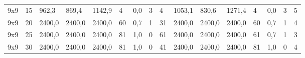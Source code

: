\begin{table}[]
\begin{tabular}{llllllllllllllll}
		9x9     & 15     & 962,3                                               & 869,4                                               & 1142,9                                              & 4                                                   & 0,0                                                 & 3      & 4                                                         & 1053,1                                              & 830,6                                               & 1271,4                                              & 4                                                   & 0,0                                                 & 3      & 5                                                         \\
		9x9     & 20     & 2400,0                                              & 2400,0                                              & 2400,0                                              & 60                                                  & 0,7                                                 & 1      & 31                                                        & 2400,0                                              & 2400,0                                              & 2400,0                                              & 60                                                  & 0,7                                                 & 1      & 4                                                         \\
		9x9     & 25     & 2400,0                                              & 2400,0                                              & 2400,0                                              & 81                                                  & 1,0                                                 & 0      & 61                                                        & 2400,0                                              & 2400,0                                              & 2400,0                                              & 61                                                  & 0,7                                                 & 1      & 3                                                         \\
		9x9     & 30     & 2400,0                                              & 2400,0                                              & 2400,0                                              & 81                                                  & 1,0                                                 & 0      & 41                                                        & 2400,0                                              & 2400,0                                              & 2400,0                                              & 81                                                  & 1,0                                                 & 0      & 4                                                         \\

\end{tabular}
\end{table}
